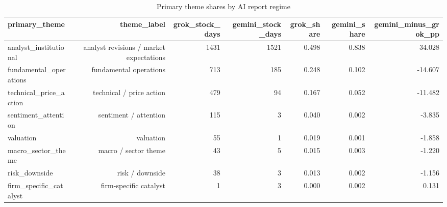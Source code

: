 \begin{table}[!htbp]\centering
\caption{Primary theme shares by AI report regime}
\label{tab:ai_model_theme_prevalence}
\begin{tabular}{lrrrrrr}
\toprule
primary\_theme & theme\_label & grok\_stock\_days & gemini\_stock\_days & grok\_share & gemini\_share & gemini\_minus\_grok\_pp \\
\midrule
analyst\_institutional & analyst revisions / market expectations & 1431 & 1521 & 0.498 & 0.838 & 34.028 \\
fundamental\_operations & fundamental operations & 713 & 185 & 0.248 & 0.102 & -14.607 \\
technical\_price\_action & technical / price action & 479 & 94 & 0.167 & 0.052 & -11.482 \\
sentiment\_attention & sentiment / attention & 115 & 3 & 0.040 & 0.002 & -3.835 \\
valuation & valuation & 55 & 1 & 0.019 & 0.001 & -1.858 \\
macro\_sector\_theme & macro / sector theme & 43 & 5 & 0.015 & 0.003 & -1.220 \\
risk\_downside & risk / downside & 38 & 3 & 0.013 & 0.002 & -1.156 \\
firm\_specific\_catalyst & firm-specific catalyst & 1 & 3 & 0.000 & 0.002 & 0.131 \\
\bottomrule
\end{tabular}
\end{table}
